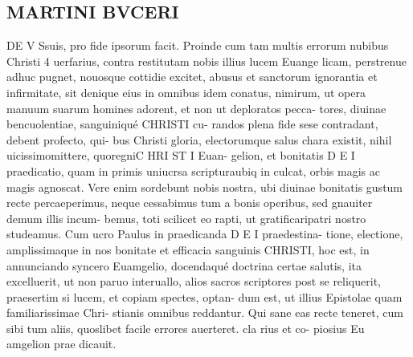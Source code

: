 \documentclass{article}
\begin{document}
\begin{pages}
\section*{MARTINI BVCERI }\pstart DE V Ssuis, pro fide ipsorum facit.  \pend\pstart Proinde cum tam multis errorum nubibus Christi 4 uerfarius, contra restitutam nobis illius lucem Euange licam, perstrenue adhuc pugnet, nouosque cottidie excitet, abusus et sanctorum ignorantia et infirmitate, sit denique eius in omnibus idem conatus, nimirum, ut opera manuum suarum homines adorent, et non ut deploratos pecca- tores, diuinae bencuolentiae, sanguiniqué CHRISTI cu- randos plena fide sese contradant, debent profecto, qui- bus Christi gloria, electorumque salus chara existit, nihil uicissimomittere, quoregniC HRI ST I Euan- gelion, et bonitatis D E I praedicatio, quam in primis uniucrsa scripturaubiq in culcat, orbis magis ac magis agnoscat.  Vere enim sordebunt nobis nostra, ubi diuinae bonitatis gustum recte percaeperimus, neque cessabimus tum a bonis operibus, sed gnauiter demum illis incum- bemus, toti scilicet eo rapti, ut gratificaripatri nostro studeamus.  \pend\pstart Cum ucro Paulus in praedicanda D E I praedestina- tione, electione, amplissimaque in nos bonitate et efficacia sanguinis CHRISTI, hoc est, in annunciando syncero Euamgelio, docendaqué doctrina certae salutis, ita excelluerit, ut non paruo interuallo, alios sacros scriptores post se reliquerit, praesertim si lucem, et copiam spectes, optan- dum est, ut illius Epistolae quam familiarissimae Chri- stianis omnibus reddantur. Qui sane eas recte teneret, cum sibi tum aliis, quoslibet facile errores auerteret.  \pendPaulus cla rius et co- piosius Eu amgelion prae dicauit. 

\end{pages}
\end{document}
